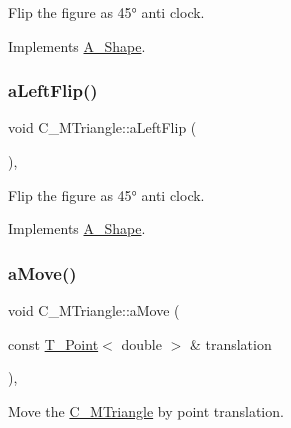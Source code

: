 Flip the figure as 45° anti clock. 



Implements \hyperlink{classA__Shape_abe947e7003cb63be2b4f6c439533427d}{A\+\_\+\+Shape}.

\mbox{\label{classC__MTriangle_a3dcac8e1341a79139577deb851a6481e}} 
\subsubsection{\texorpdfstring{a\+Left\+Flip()}{aLeftFlip()}\hspace{0.1cm}{\footnotesize\ttfamily [2/2]}}
{\footnotesize\ttfamily void C\+\_\+\+M\+Triangle\+::a\+Left\+Flip (\begin{DoxyParamCaption}{ }\end{DoxyParamCaption})\hspace{0.3cm}{\ttfamily [override]}, {\ttfamily [virtual]}}



Flip the figure as 45° anti clock. 



Implements \hyperlink{classA__Shape_abe947e7003cb63be2b4f6c439533427d}{A\+\_\+\+Shape}.

\mbox{\label{classC__MTriangle_a4e185345e7e1ffd5c0b7f1f8dfdbdc59}} 
\subsubsection{\texorpdfstring{a\+Move()}{aMove()}\hspace{0.1cm}{\footnotesize\ttfamily [1/2]}}
{\footnotesize\ttfamily void C\+\_\+\+M\+Triangle\+::a\+Move (\begin{DoxyParamCaption}\item[{const \hyperlink{classT__Point}{T\+\_\+\+Point}$<$ double $>$ \&}]{translation }\end{DoxyParamCaption})\hspace{0.3cm}{\ttfamily [override]}, {\ttfamily [virtual]}}



Move the \hyperlink{classC__MTriangle}{C\+\_\+\+M\+Triangle} by point translation. 


